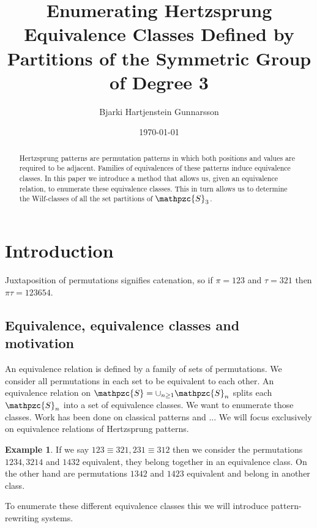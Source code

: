 \documentclass[a4paper, 11pt]{article}
\theoremstyle{definition}
\newtheorem{example}[theorem]{Example}
\newcommand{\Sym}{\mathpzc{S}}
\begin{document}
\title{Enumerating Hertzsprung Equivalence Classes Defined by Partitions of the Symmetric Group of Degree 3}
\author{Bjarki Hartjenstein Gunnarsson}
\date{\today}
\maketitle

\begin{abstract}
    Hertzsprung patterns are permutation patterns in which both positions and
    values are required to be adjacent. Families of equivalences of these
    patterns induce equivalence classes. In this paper we introduce a method
    that allows us, given an equivalence relation, to enumerate these
    equivalence classes. This in turn allows us to determine the Wilf-classes of
    all the set partitions of $\Sym_3$.
\end{abstract}

\section{Introduction}
Juxtaposition of permutations signifies catenation, so if $\pi=123$ and
$\tau=321$ then $\pi\tau=123654$.

\subsection{Equivalence, equivalence classes and motivation}
An equivalence relation is defined by a family of sets of permutations. We
consider all permutations in each set to be equivalent to each other. An
equivalence relation on $\Sym = \cup_{n \geq 1} \Sym_n$ splits each $\Sym_n$
into a set of equivalence classes.  We want to enumerate those classes.  Work
has been done on classical patterns and ... \cite{linton}  We will focus
exclusively on equivalence relations of Hertzsprung patterns. 

\begin{example}
    If we say $123 \equiv 321, 231 \equiv 312$ then we consider the permutations
    $1234, 3214$ and $1432$ equivalent, they belong together in an equivalence
    class. On the other hand are permutations $1342$ and $1423$ equivalent and belong in
    another class.
\end{example}

To enumerate these different equivalence classes this we will introduce
pattern-rewriting systems.
\end{document}
